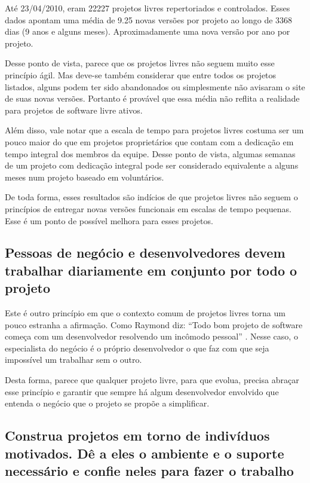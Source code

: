 Até 23/04/2010, eram 22227 projetos livres repertoriados e
controlados. Esses dados apontam uma média de 9.25 novas versões por
projeto ao longo de 3368 dias (9 anos e alguns meses).
Aproximadamente uma nova versão por ano por projeto.

Desse ponto de vista, parece que os projetos livres não seguem muito
esse princípio ágil. Mas deve-se também considerar que entre todos os
projetos listados, alguns podem ter sido abandonados ou simplesmente
não avisaram o site de suas novas versões. Portanto é provável que
essa média não reflita a realidade para projetos de software livre
ativos.

Além disso, vale notar que a escala de tempo para projetos livres
costuma ser um pouco maior do que em projetos proprietários que contam
com a dedicação em tempo integral dos membros da equipe. Desse ponto
de vista, algumas semanas de um projeto com dedicação integral pode
ser considerado equivalente a alguns meses num projeto baseado em
voluntários.

De toda forma, esses resultados são indícios de que projetos livres
não seguem o princípios de entregar novas versões funcionais em
escalas de tempo pequenas. Esse é um ponto de possível melhora para
esses projetos.

\subsection{Pessoas de negócio e desenvolvedores devem trabalhar
  diariamente em conjunto por todo o projeto}

Este é outro princípio em que o contexto comum de projetos livres
torna um pouco estranha a afirmação. Como Raymond diz: ``Todo bom
projeto de software começa com um desenvolvedor resolvendo um incômodo
pessoal'' \cite{Raymond1999}. Nesse caso, o especialista do negócio é
o próprio desenvolvedor o que faz com que seja impossível um trabalhar
sem o outro.

Desta forma, parece que qualquer projeto livre, para que evolua,
precisa abraçar esse princípio e garantir que sempre há algum
desenvolvedor envolvido que entenda o negócio que o projeto se propõe
a simplificar.

\subsection{ Construa projetos em torno de indivíduos motivados.  Dê a
  eles o ambiente e o suporte necessário e confie neles para fazer o
  trabalho}

